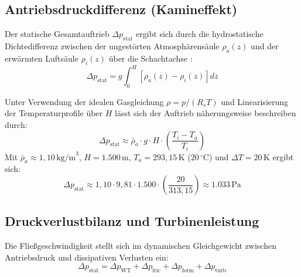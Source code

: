 \documentclass[journal]{IEEEtran}
\begin{document}
\subsection{Antriebsdruckdifferenz (Kamineffekt)}
Der statische Gesamtauftrieb $\Delta p_{\text{stat}}$ ergibt sich durch die hydrostatische Dichtedifferenz zwischen der ungestörten Atmosphärensäule $\rho_a(z)$ und der erwärmten Luftsäule $\rho_i(z)$ über die Schachtachse \cite{schlaich1995}:
\begin{equation}
\Delta p_{\text{stat}} = g \int_0^H \left[ \rho_a(z) - \rho_i(z) \right] dz
\end{equation}

Unter Verwendung der idealen Gasgleichung $\rho = p / (R_s T)$ und Linearisierung der Temperaturprofile über $H$ lässt sich der Auftrieb näherungsweise beschreiben durch:
\begin{equation}
\Delta p_{\text{stat}} \approx \bar{\rho}_a \cdot g \cdot H \cdot \left( \frac{T_i - T_a}{T_i} \right)
\end{equation}
Mit $\bar{\rho}_a \approx 1{,}10\,\text{kg/m}^3$, $H = 1.500\,\text{m}$, $T_a = 293{,}15\,\text{K}$ ($20\,^\circ\text{C}$) und $\Delta T = 20\,\text{K}$ ergibt sich:
\begin{equation}
\Delta p_{\text{stat}} \approx 1{,}10 \cdot 9{,}81 \cdot 1.500 \cdot \left(\frac{20}{313{,}15}\right) \approx 1.033\,\text{Pa}
\end{equation}

\subsection{Druckverlustbilanz und Turbinenleistung}
Die Fließgeschwindigkeit stellt sich im dynamischen Gleichgewicht zwischen Antriebsdruck und dissipativen Verlusten ein:
\begin{equation}
\Delta p_{\text{stat}} = \Delta p_{\text{WT}} + \Delta p_{\text{fric}} + \Delta p_{\text{form}} + \Delta p_{\text{turb}}
\end{equation}
\end{document}
